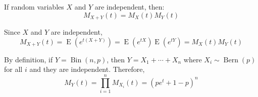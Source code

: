 \documentclass{huhtakm-template-book-v2}
\DeclareMathOperator{\E}{E}
\DeclareMathOperator{\Bern}{Bern}
\DeclareMathOperator{\Bin}{Bin}
\begin{document}
\begin{lem}
	If random variables $X$ and $Y$ are independent, then:
	\begin{equation*}
		M_{X+Y}(t)=M_{X}(t)M_{Y}(t)
	\end{equation*}
\end{lem}
\begin{proofing}
	Since $X$ and $Y$ are independent,
	\begin{equation*}
		M_{X+Y}(t)=\E(e^{t(X+Y)})=\E(e^{tX})\E(e^{tY})=M_{X}(t)M_{Y}(t)
	\end{equation*}
\end{proofing}
\begin{eg}
	By definition, if $Y=\Bin(n,p)$, then $Y=X_{1}+\cdots+X_{n}$ where $X_{i}\sim\Bern(p)$ for all $i$ and they are independent. Therefore,
	\begin{equation*}
		M_{Y}(t)=\prod_{i=1}^{n}M_{X_{i}}(t)=(pe^{t}+1-p)^{n}
	\end{equation*}
\end{eg}
\end{document}
